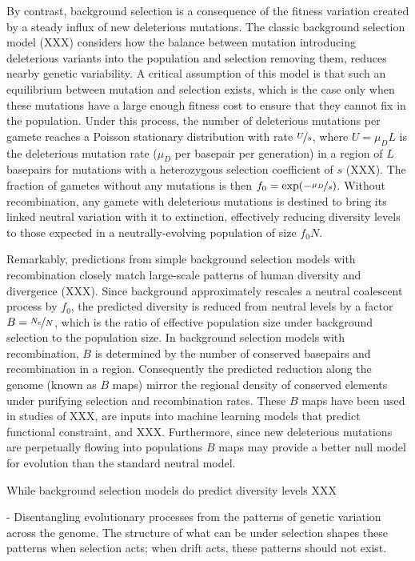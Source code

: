 \documentclass[11pt]{article}
\begin{document}
By contrast, background selection is a consequence of the fitness variation
created by a steady influx of new deleterious mutations. The classic background
selection model (XXX) considers how the balance between mutation introducing
deleterious variants into the population and selection removing them, reduces
nearby genetic variability. A critical assumption of this model is that such an
equilibrium between mutation and selection exists, which is the case only when
these mutations have a large enough fitness cost to ensure that they cannot fix
in the population. Under this process, the number of deleterious mutations per
gamete reaches a Poisson stationary distribution with rate $\nicefrac{U}{s}$,
where $U = \mu_D L$ is the deleterious mutation rate ($\mu_D$ per basepair per
generation) in a region of $L$ basepairs for mutations with a heterozygous
selection coefficient of $s$ (XXX). The fraction of gametes without any
mutations is then $f_0 = \exp(-\nicefrac{\mu_D}{s})$. Without recombination,
any gamete with deleterious mutations is destined to bring its linked neutral
variation with it to extinction, effectively reducing diversity levels to those
expected in a neutrally-evolving population of size $f_0 N$. 

Remarkably, predictions from simple background selection models with
recombination closely match large-scale patterns of human diversity and
divergence (XXX). Since background approximately rescales a neutral coalescent
process by $f_0$, the predicted diversity is reduced from neutral levels by a
factor $B = \nicefrac{N_e}{N}$, which is the ratio of effective population size
under background selection to the population size. In background selection
models with recombination, $B$ is determined by the number of conserved
basepairs and recombination in a region. Consequently the predicted reduction
along the genome (known as $B$ maps) mirror the regional density of conserved
elements under purifying selection and recombination rates. These $B$ maps have
been used in studies of XXX, are inputs into machine learning models that
predict functional constraint, and XXX. Furthermore, since new deleterious
mutations are perpetually flowing into populations $B$ maps may provide a
better null model for evolution than the standard neutral model.

While background selection models do predict diversity levels  XXX

- Disentangling evolutionary processes from the patterns of genetic variation
across the genome. The structure of what can be under selection shapes these
patterns when selection acts; when drift acts, these patterns should not exist.
\end{document}
